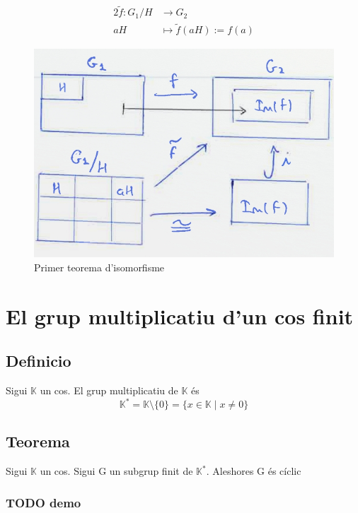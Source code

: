 \documentclass[11pt]{article}
\begin{document}
\begin{alignat*}{2}
\tilde{f}: G_1/H &\to G_2 \\
aH &\mapsto \tilde{f}(aH) := f(a)
\end{alignat*}
\begin{figure}[htbp]
\centering
\includegraphics[width=.9\linewidth]{./images/primeriso.jpg}
\caption{\label{fig:org93aa0a9}
Primer teorema d'isomorfisme}
\end{figure}

\section{El grup multiplicatiu d'un cos finit}
\label{sec:org99ee81a}

\subsection{Definicio}
\label{sec:orga2e033c}
Sigui \(\mathbb{K}\) un cos. El grup multiplicatiu de \(\mathbb{K}\) és \\
\begin{equation*}
\mathbb{K}^* = \mathbb{K} \setminus \{0\} = \{x \in \mathbb{K} \mid x \neq 0\}
\end{equation*}

\subsection{Teorema}
\label{sec:orga12f918}
Sigui \(\mathbb{K}\) un cos. Sigui G un subgrup finit de \(\mathbb{K}^*\). Aleshores G és cíclic

\subsubsection{{\bfseries\sffamily TODO} demo}
\label{sec:org953cc86}
\end{document}
